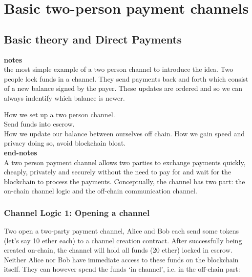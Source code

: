 \section{Basic two-person payment channels}


\subsection{Basic theory and Direct Payments}

\textbf{notes}\\
the most simple example of a two person channel to introduce the idea. Two people lock funds in a channel. They send payments back and forth which consist of a new balance signed by the payer. These updates are ordered and so we can always indentify which balance is newer.

How we set up a two person channel. \\
Send funds into escrow. \\
How we update our balance between ourselves off chain. How we gain speed and privacy doing so, avoid blockchain bloat.\\
\textbf{end-notes}\\[2cm]

A two person payment channel allows two parties to exchange payments quickly, cheaply, privately and securely without the need to pay for and wait for the blockchain to process the payments. Conceptually, the channel has two part: the on-chain channel logic and the off-chain communication channel.
\subsubsection*{Channel Logic 1: Opening a channel}
Two open a two-party payment channel, Alice and Bob each send some tokens (let's say 10 ether each) to a channel creation contract. After successfully being created on-chain, the channel will hold all funds (20 ether) locked in escrow. Neither Alice nor Bob have immediate access to these funds on the blockchain itself. They can however spend the funds `in channel', i.e. in the off-chain part:
